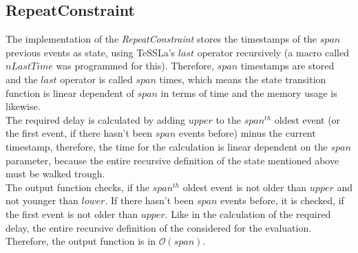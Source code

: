 \subsection{RepeatConstraint}
	The implementation of the \emph{RepeatConstraint} stores the timestamps of the $span$ previous events as state, using TeSSLa's $last$ operator recursively (a macro called $nLastTime$ was programmed for this). Therefore, $span$ timestamps are stored and the $last$ operator is called $span$ times, which means the state transition function is linear dependent of $span$ in terms of time and the memory usage is likewise.\\
	The required delay is calculated by adding $upper$ to the  $span^{th}$ oldest event (or the first event, if there hasn't been $span$ events before) minus the current timestamp, therefore, the time for the calculation is linear dependent on the $span$ parameter, because the entire recursive definition of the state mentioned above must be walked trough.\\
	The output function checks, if the $span^{th}$ oldest event is not older than $upper$ and not younger than $lower$. If there hasn't been $span$ events before, it is checked, if the first event is not older than $upper$. Like in the calculation of the required delay, the entire recursive definition of the considered for the evaluation. Therefore, the output function is in $\mathcal{O}(span)$.
	

